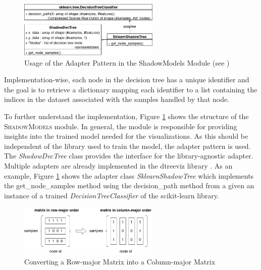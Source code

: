 \begin{figure}
    \centering
    \includegraphics[width=0.6\textwidth]{images/implementation/ShadowModelAdapterPattern.png}
    \caption{Usage of the Adapter Pattern in the ShadowModels Module (see \cite{dtreeviz})}
    \label{fig:adapterPatternShadowModels}
\end{figure}

Implementation-wise, each node in the decision tree has a unique identifier and the goal is to retrieve a dictionary mapping each identifier to a list containing the indices in the dataset associated with the samples handled by that node. 

To further understand the implementation, Figure \ref{fig:adapterPatternShadowModels} shows the structure of the \textsc{ShadowModels} module. In general, the module is responsible for providing insights into the trained model needed for the visualizations. As this should be independent of the library used to train the model, the adapter pattern is used. The \emph{ShadowDecTree} class provides the interface for the library-agnostic adapter. Multiple adapters are already implemented in the dtreeviz library \cite{dtreeviz}. As an example, Figure \ref{fig:adapterPatternShadowModels} shows the adapter class \emph{SklearnShadowTree} which implements the \glqq get\_node\_samples\grqq{} method using the \glqq decision\_path\grqq{} method from a given an instance of a trained \emph{DecisionTreeClassifier} of the scikit-learn library. 

\begin{figure}
    \centering
    \includegraphics[width=0.6\textwidth]{images/implementation/row-to-column-major-matrix.png}
    \caption{Converting a Row-major Matrix into a Column-major Matrix}
    \label{fig:rowToColumnMajor}
\end{figure}

